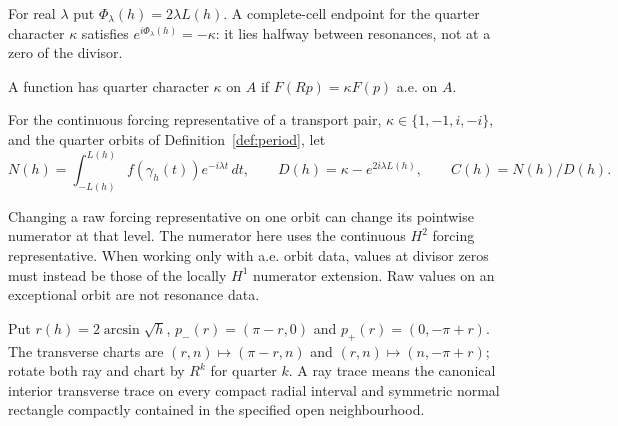 \begin{definition}
\label{def:phase-cell-scalars}
\leanok
For real $\lambda$ put $\Phi_\lambda(h)=2\lambda L(h)$.
A complete-cell endpoint for the quarter character $\kappa$ satisfies
$e^{i\Phi_\lambda(h)}=-\kappa$: it lies halfway between resonances,
not at a zero of the divisor.
\end{definition}

\begin{definition}
\label{def:quarter-character}
\leanok
A function has quarter character $\kappa$ on $A$ if
$F(Rp)=\kappa F(p)$ a.e. on $A$.
\end{definition}

\begin{definition}
\label{def:numerator}
\leanok
For the continuous forcing representative of a transport pair,
$\kappa\in\{1,-1,i,-i\}$, and the quarter orbits of
Definition~\ref{def:period}, let
\[
  N(h)=\int_{-L(h)}^{L(h)}f(\gamma_h(t))e^{-i\lambda t}\,dt,\qquad
  D(h)=\kappa-e^{2i\lambda L(h)},\qquad C(h)=N(h)/D(h).
\]
\end{definition}

\begin{remark}
Changing a raw forcing representative on one orbit can change its pointwise
numerator at that level. The numerator here uses the continuous $H^2$
forcing representative. When working only with a.e. orbit data, values
at divisor zeros must instead be those of the locally $H^1$ numerator
extension. Raw values on an exceptional orbit are not resonance data.
\end{remark}

\begin{definition}
\label{def:quarter-endpoint-rays}
\leanok
Put $r(h)=2\arcsin\sqrt h$, $p_-(r)=(\pi-r,0)$ and $p_+(r)=(0,-\pi+r)$.
The transverse charts are $(r,n)\mapsto(\pi-r,n)$ and
$(r,n)\mapsto(n,-\pi+r)$; rotate both ray and chart by $R^k$ for quarter $k$.
A ray trace means the canonical interior
transverse trace on every compact radial interval and symmetric normal
rectangle compactly contained in the specified open neighbourhood.
\end{definition}

